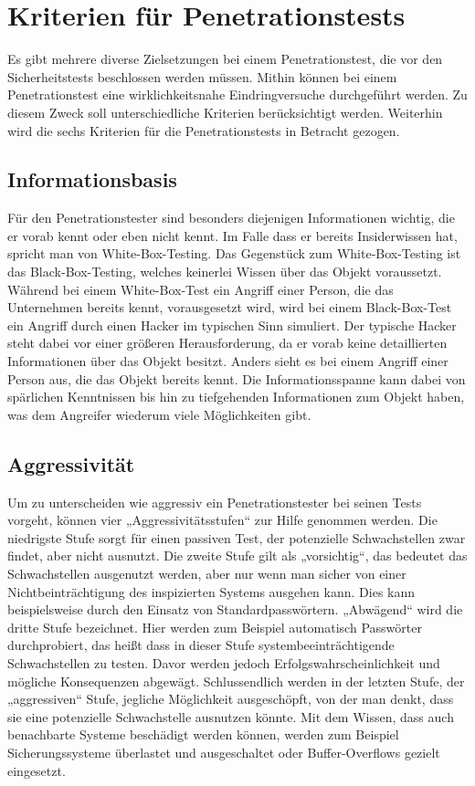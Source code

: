 \section{Kriterien für Penetrationstests}
\label{kriterpent}

Es gibt mehrere diverse Zielsetzungen bei einem Penetrationstest, die vor den Sicherheitstests beschlossen werden müssen. Mithin können bei einem Penetrationstest eine wirklichkeitsnahe Eindringversuche durchgeführt werden. Zu diesem Zweck soll unterschiedliche Kriterien berücksichtigt werden. Weiterhin wird die sechs Kriterien für die Penetrationstests in Betracht gezogen.

\subsection{Informationsbasis}

Für den Penetrationstester sind besonders diejenigen Informationen wichtig, die er vorab kennt oder eben nicht kennt. Im Falle dass er bereits Insiderwissen hat, spricht man von White-Box-Testing. Das Gegenstück zum White-Box-Testing ist das Black-Box-Testing, welches keinerlei Wissen über das Objekt voraussetzt. Während bei einem White-Box-Test ein Angriff einer Person, die das Unternehmen bereits kennt, vorausgesetzt wird, wird bei einem Black-Box-Test ein Angriff durch einen Hacker im typischen Sinn simuliert. Der typische Hacker steht dabei vor einer größeren Herausforderung, da er vorab keine detaillierten Informationen über das Objekt besitzt. Anders sieht es bei einem Angriff einer Person aus, die das Objekt bereits kennt. Die Informationsspanne kann dabei von spärlichen Kenntnissen bis hin zu tiefgehenden Informationen zum Objekt haben, was dem Angreifer wiederum viele Möglichkeiten gibt\cite[13--14]{pt03bsi}. 

\subsection{Aggressivität}

Um zu unterscheiden wie aggressiv ein Penetrationstester bei seinen Tests vorgeht, können vier „Aggressivitätsstufen“ zur Hilfe genommen werden. Die niedrigste Stufe sorgt für einen passiven Test, der potenzielle Schwachstellen zwar findet, aber nicht ausnutzt. Die zweite Stufe gilt als „vorsichtig“, das bedeutet das Schwachstellen ausgenutzt werden, aber nur wenn man sicher von einer Nichtbeinträchtigung des inspizierten Systems ausgehen kann. Dies kann beispielsweise durch den Einsatz von Standardpasswörtern. „Abwägend“ wird die dritte Stufe bezeichnet. Hier werden zum Beispiel automatisch Passwörter durchprobiert, das heißt dass in dieser Stufe systembeeinträchtigende Schwachstellen zu testen. Davor werden jedoch Erfolgswahrscheinlichkeit und mögliche Konsequenzen abgewägt. Schlussendlich werden in der letzten Stufe, der „aggressiven“ Stufe, jegliche Möglichkeit ausgeschöpft, von der man denkt, dass sie eine potenzielle Schwachstelle ausnutzen könnte. Mit dem Wissen, dass auch benachbarte Systeme beschädigt werden können, werden zum Beispiel Sicherungssysteme überlastet und ausgeschaltet oder Buffer-Overflows gezielt eingesetzt\cite[14]{pt03bsi}. 

